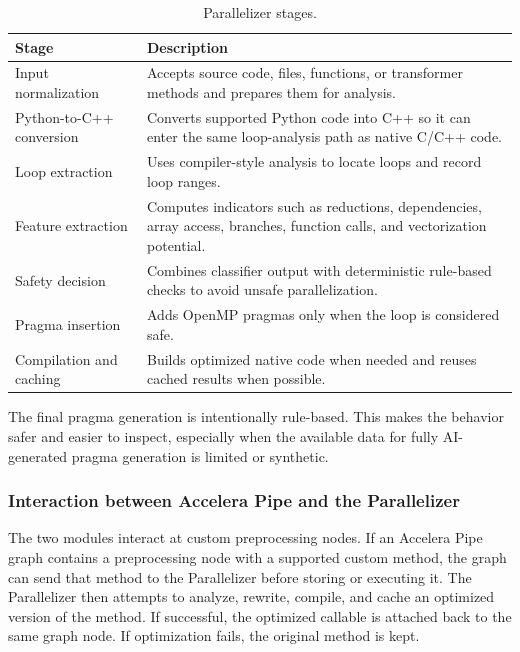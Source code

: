 \documentclass[12pt,a4paper]{report}
\begin{document}
\begin{table}[!htbp]
\centering
\normalsize
\renewcommand{\arraystretch}{1.08}
\setlength{\tabcolsep}{4pt}
\caption{Parallelizer stages.}
\label{tab:parallelizer-stages}
\begin{tabularx}{\textwidth}{p{}X}
\toprule
\textbf{Stage} & \textbf{Description} \\
\midrule

Input normalization &
Accepts source code, files, functions, or transformer methods and prepares them
for analysis. \\
\midrule

Python-to-C++ conversion &
Converts supported Python code into C++ so it can enter the same loop-analysis
path as native C/C++ code. \\
\midrule

Loop extraction &
Uses compiler-style analysis to locate loops and record loop ranges. \\
\midrule

Feature extraction &
Computes indicators such as reductions, dependencies, array access, branches,
function calls, and vectorization potential. \\
\midrule

Safety decision &
Combines classifier output with deterministic rule-based checks to avoid unsafe
parallelization. \\
\midrule

Pragma insertion &
Adds OpenMP pragmas only when the loop is considered safe. \\
\midrule

Compilation and caching &
Builds optimized native code when needed and reuses cached results when
possible. \\

\bottomrule
\end{tabularx}
\end{table}

The final pragma generation is intentionally rule-based. This makes the behavior
safer and easier to inspect, especially when the available data for fully
AI-generated pragma generation is limited or synthetic.


\subsubsection*{Interaction between Accelera Pipe and the Parallelizer}

The two modules interact at custom preprocessing nodes. If an Accelera Pipe graph
contains a preprocessing node with a supported custom method, the graph can send
that method to the Parallelizer before storing or executing it. The Parallelizer
then attempts to analyze, rewrite, compile, and cache an optimized version of the
method. If successful, the optimized callable is attached back to the same graph
node. If optimization fails, the original method is kept.
\end{document}
